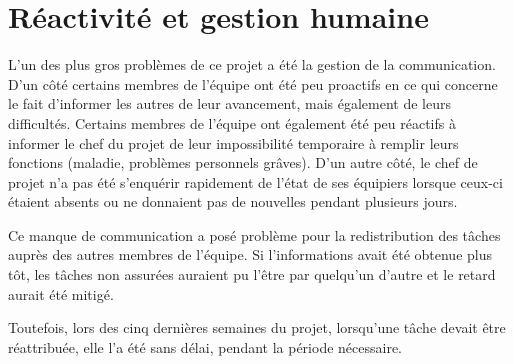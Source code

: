 \section{Réactivité et gestion humaine}

L'un des plus gros problèmes de ce projet a été la gestion de
la communication. D'un côté certains membres de l'équipe ont
été peu proactifs en ce qui concerne le fait d'informer les
autres de leur avancement, mais également de leurs
difficultés. Certains membres de l'équipe ont également été
peu réactifs à informer le chef du projet de leur
impossibilité temporaire à remplir leurs fonctions (maladie,
problèmes personnels grâves). D'un autre côté, le chef de
projet n'a pas été s'enquérir rapidement de l'état de ses
équipiers lorsque ceux-ci étaient absents ou ne donnaient pas
de nouvelles pendant plusieurs jours.
\newline

Ce manque de communication a posé problème pour la
redistribution des tâches auprès des autres membres de
l'équipe. Si l'informations avait été obtenue plus tôt, les
tâches non assurées auraient pu l'être par quelqu'un d'autre
et le retard aurait été mitigé.
\newline

Toutefois, lors des cinq dernières semaines du projet,
lorsqu'une tâche devait être réattribuée, elle l'a été sans
délai, pendant la période nécessaire.
